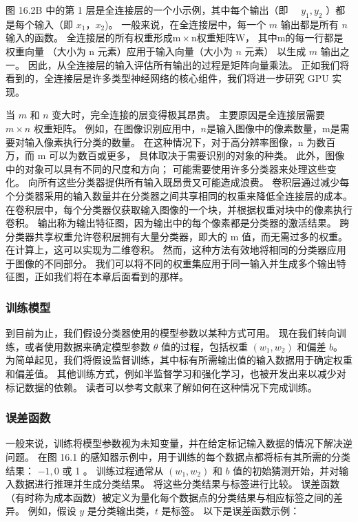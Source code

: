 图 16.2B 中的第 1 层是全连接层的一个小示例，其中每个输出（即 $\quad y_{1}, y_{2}$ ）都是每个输入（即 $x_{ 1}，x_{2}$)。 
一般来说，在全连接层中，每一个 $m$ 输出都是所有 $n$ 输入的函数。 
全连接层的所有权重形成$\mathrm{m} \times \mathrm{n}$权重矩阵$\mathrm{W}$，
其中$\mathrm{m}$的每一行都是权重向量 （大小为 $\mathrm{n}$ 元素）应用于输入向量（大小为 $n$ 元素）
以生成 $m$ 输出之一。 因此，从全连接层的输入评估所有输出的过程是矩阵向量乘法。 
正如我们将看到的，全连接层是许多类型神经网络的核心组件，我们将进一步研究 GPU 实现。

当 $m$ 和 $n$ 变大时，完全连接的层变得极其昂贵。 主要原因是全连接层需要 $m \times n$ 权重矩阵。 
例如，在图像识别应用中，$n$是输入图像中的像素数量，$\mathrm{m}$是需要对输入像素执行分类的数量。 
在这种情况下，对于高分辨率图像，$\mathrm{n}$ 为数百万，而 $\mathrm{m}$ 可以为数百或更多，
具体取决于需要识别的对象的种类。 此外，图像中的对象可以具有不同的尺度和方向； 可能需要使用许多分类器来处理这些变化。 
向所有这些分类器提供所有输入既昂贵又可能造成浪费。 
卷积层通过减少每个分类器采用的输入数量并在分类器之间共享相同的权重来降低全连接层的成本。 
在卷积层中，每个分类器仅获取输入图像的一个块，并根据权重对块中的像素执行卷积。 
输出称为输出特征图，因为输出中的每个像素都是分类器的激活结果。 
跨分类器共享权重允许卷积层拥有大量分类器，即大的 $\mathrm{m}$ 值，而无需过多的权重。 
在计算上，这可以实现为二维卷积。 然而，这种方法有效地将相同的分类器应用于图像的不同部分。 
我们可以将不同的权重集应用于同一输入并生成多个输出特征图，正如我们将在本章后面看到的那样。

\subsubsection{训练模型}
到目前为止，我们假设分类器使用的模型参数以某种方式可用。 
现在我们转向训练，或者使用数据来确定模型参数 $\theta$ 值的过程，包括权重 $\left(w_{1}, w_{2}\right)$ 和偏差 $b $。 
为简单起见，我们将假设监督训练，其中标有所需输出值的输入数据用于确定权重和偏差值。 
其他训练方式，例如半监督学习和强化学习，也被开发出来以减少对标记数据的依赖。 
读者可以参考文献来了解如何在这种情况下完成训练。

\subsubsection{误差函数}
一般来说，训练将模型参数视为未知变量，并在给定标记输入数据的情况下解决逆问题。 
在图 16.1 的感知器示例中，用于训练的每个数据点都将标有其所需的分类结果： $-1,0$ 或 1 。 
训练过程通常从 $\left(w_{1}, w_{2}\right)$ 和 $b$ 值的初始猜测开始，并对输入数据进行推理并生成分类结果。 
将这些分类结果与标签进行比较。 误差函数（有时称为成本函数）被定义为量化每个数据点的分类结果与相应标签之间的差异。 
例如，假设 $y$ 是分类输出类，$t$ 是标签。 以下是误差函数示例：

